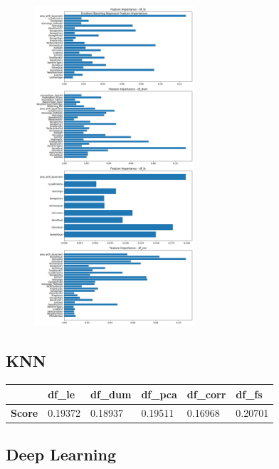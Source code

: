 \begin{figure}[H]
  \centering
  \includegraphics[width=0.53\textwidth]{./fig/GradientBoostingRegressor.png}
  \label{fig:corr1}
  \caption{}
\end{figure}








\subsection{KNN}
\begin{table}[H]
\begin{tabular}{l|l|l|l|l|l|}
\cline{2-6}
                                   & \textbf{df\_le} & \textbf{df\_dum} & \textbf{df\_pca} & \textbf{df\_corr} & \textbf{df\_fs} \\ \hline
\multicolumn{1}{|l|}{\textbf{Score}} & 0.19372         & 0.18937           & 0.19511          & 0.16968           & 0.20701         \\ \hline
\end{tabular}
\end{table}


\subsection{Deep Learning}

